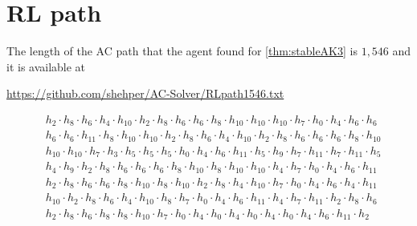 
\section{RL path \label{app:RLpath}}

The length of the AC path that the agent found for \autoref{thm:stableAK3} is $1,546$ and it is available at
\begin{center}
	\href{https://github.com/shehper/AC-Solver/RLpath1546.txt}{https://github.com/shehper/AC-Solver/RLpath1546.txt}
\end{center}
\[
\begin{aligned}
& h_{2} \cdot h_{8} \cdot h_{6} \cdot h_{4} \cdot h_{10} \cdot h_{2} \cdot h_{8} \cdot h_{6} \cdot h_{6} \cdot h_{8} \cdot h_{10} \cdot h_{10} \cdot h_{10} \cdot h_{7} \cdot h_{0} \cdot h_{4} \cdot h_{6} \cdot h_{6} \\ &
h_{6} \cdot h_{6} \cdot h_{11} \cdot h_{8} \cdot h_{10} \cdot h_{10} \cdot h_{2} \cdot h_{8} \cdot h_{6} \cdot h_{4} \cdot h_{10} \cdot h_{2} \cdot h_{8} \cdot h_{6} \cdot h_{6} \cdot h_{6} \cdot h_{8} \cdot h_{10} \\ &
h_{10} \cdot h_{10} \cdot h_{7} \cdot h_{3} \cdot h_{5} \cdot h_{5} \cdot h_{5} \cdot h_{0} \cdot h_{4} \cdot h_{6} \cdot h_{11} \cdot h_{5} \cdot h_{9} \cdot h_{7} \cdot h_{11} \cdot h_{7} \cdot h_{11} \cdot h_{5} \\ &
h_{4} \cdot h_{9} \cdot h_{2} \cdot h_{8} \cdot h_{6} \cdot h_{6} \cdot h_{6} \cdot h_{8} \cdot h_{10} \cdot h_{8} \cdot h_{10} \cdot h_{10} \cdot h_{4} \cdot h_{7} \cdot h_{0} \cdot h_{4} \cdot h_{6} \cdot h_{11} \\ &
h_{2} \cdot h_{8} \cdot h_{6} \cdot h_{6} \cdot h_{8} \cdot h_{10} \cdot h_{8} \cdot h_{10} \cdot h_{2} \cdot h_{8} \cdot h_{4} \cdot h_{10} \cdot h_{7} \cdot h_{0} \cdot h_{4} \cdot h_{6} \cdot h_{4} \cdot h_{11} \\ &
h_{10} \cdot h_{2} \cdot h_{8} \cdot h_{6} \cdot h_{4} \cdot h_{10} \cdot h_{8} \cdot h_{7} \cdot h_{0} \cdot h_{4} \cdot h_{6} \cdot h_{11} \cdot h_{4} \cdot h_{7} \cdot h_{11} \cdot h_{2} \cdot h_{8} \cdot h_{6} \\ &
h_{2} \cdot h_{8} \cdot h_{6} \cdot h_{8} \cdot h_{8} \cdot h_{10} \cdot h_{7} \cdot h_{0} \cdot h_{4} \cdot h_{0} \cdot h_{4} \cdot h_{0} \cdot h_{4} \cdot h_{0} \cdot h_{4} \cdot h_{6} \cdot h_{11} \cdot h_{2} \\ &

\end{aligned}\]
